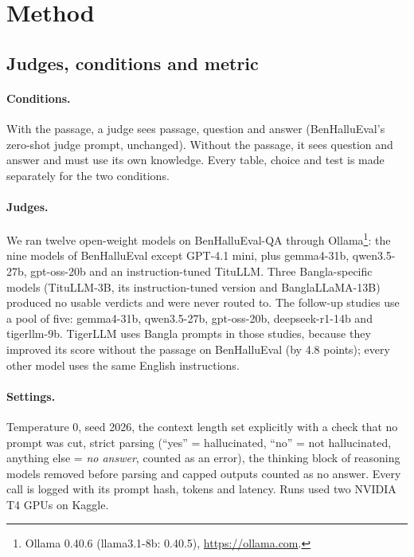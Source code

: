 \documentclass[pdflatex,sn-apa]{sn-jnl}
\begin{document}
\section{Method}\label{sec:method}

\subsection{Judges, conditions and metric}

\paragraph{Conditions.} With the passage, a judge sees passage, question and answer (BenHalluEval's zero-shot judge
prompt, unchanged). Without the passage, it sees question and answer and must use its own knowledge. Every table,
choice and test is made separately for the two conditions.

\paragraph{Judges.} We ran twelve open-weight models on BenHalluEval-QA through Ollama\footnote{Ollama 0.40.6
(llama3.1-8b: 0.40.5), \url{https://ollama.com}.}: the nine models of BenHalluEval except GPT-4.1 mini, plus
gemma4-31b, qwen3.5-27b, gpt-oss-20b and an instruction-tuned TituLLM. Three Bangla-specific models (TituLLM-3B, its
instruction-tuned version and BanglaLLaMA-13B) produced no usable verdicts and were never routed to. The follow-up
studies use a pool of five: gemma4-31b, qwen3.5-27b, gpt-oss-20b, deepseek-r1-14b and tigerllm-9b. TigerLLM uses Bangla
prompts in those studies, because they improved its score without the passage on BenHalluEval (by 4.8 points);
every other model uses the same English instructions.

\paragraph{Settings.} Temperature 0, seed 2026, the context length set explicitly with a check that no prompt was cut,
strict parsing (``yes'' = hallucinated, ``no'' = not hallucinated, anything else = \emph{no answer}, counted as an
error), the thinking block of reasoning models removed before parsing and capped outputs counted as no answer. Every
call is logged with its prompt hash, tokens and latency. Runs used two NVIDIA T4 GPUs on Kaggle.
\end{document}
